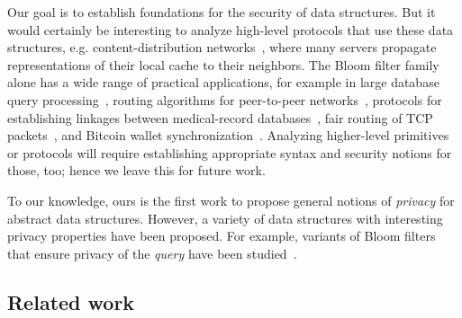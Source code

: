 %
%
Our goal is to establish foundations for the security of  data
structures. But it would certainly be interesting to analyze high-level
protocols that use these data structures, e.g.
content-distribution networks~\cite{byers2002informed}, where many servers
propagate representations of their local cache to their neighbors. The Bloom
filter family alone has a wide range of practical applications, for example in
large database query processing~\cite{broder2004network}, routing algorithms for
peer-to-peer networks~\cite{reynolds2003efficient}, protocols for establishing
linkages between medical-record databases~\cite{schnell2011novel}, fair routing
of TCP packets~\cite{feng2001stochastic}, and Bitcoin wallet
synchronization~\cite{gervais2014privacy}.
%
Analyzing higher-level primitives or protocols will require establishing
appropriate syntax and security notions for those, too; hence we leave this for
future work.

To our knowledge, ours is the first work to propose general
notions of \emph{privacy} for abstract data structures.  However, a variety of
data structures with interesting privacy properties have been proposed.  For
example, variants of Bloom filters that ensure privacy of the \emph{query} have
been studied~\cite{bellovin2004privacy,nojima2009cryptographically}.

\subsection{Related work}




